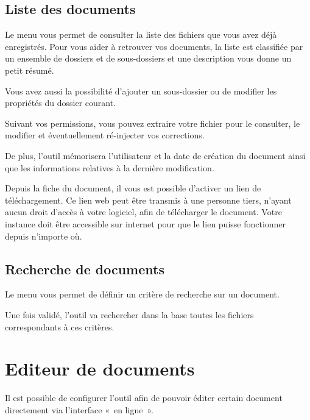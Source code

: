 \documentclass[a4paper,10pt,oneside,french]{sphinxmanual}
\begin{document}
\subsection{Liste des documents}
\label{\detokenize{documents/shared_document:liste-des-documents}}
Le menu  vous permet de consulter la liste des fichiers que vous avez déjà enregistrés. Pour vous aider à retrouver vos documents, la liste est classifiée par un ensemble de dossiers et de sous-dossiers et une description vous donne un petit résumé.

Vous avez aussi la possibilité d’ajouter un sous-dossier ou de modifier les propriétés du dossier courant.

\noindent{}

Suivant vos permissions, vous pouvez extraire votre fichier pour le consulter, le modifier et éventuellement ré-injecter vos corrections.

De plus, l’outil mémorisera l’utilisateur et la date de création du document ainsi que les informations relatives à la dernière modification.

\noindent{}

Depuis la fiche du document, il vous est possible d’activer un lien de téléchargement.
Ce lien web peut être transmis à une personne tiers, n’ayant aucun droit d’accès à votre logiciel, afin de télécharger le document.
 Votre instance doit être accessible sur internet pour que le lien puisse fonctionner depuis n’importe où.


\subsection{Recherche de documents}
\label{\detokenize{documents/shared_document:recherche-de-documents}}
Le menu  vous permet de définir un critère de recherche sur un document.

Une fois validé, l’outil va rechercher dans la base toutes les fichiers correspondants à ces critères.


\section{Editeur de documents}
\label{\detokenize{documents/editor:editeur-de-documents}}\label{\detokenize{documents/editor::doc}}
Il est possible de configurer l’outil afin de pouvoir éditer certain document directement via l’interface « en ligne ».
\end{document}
